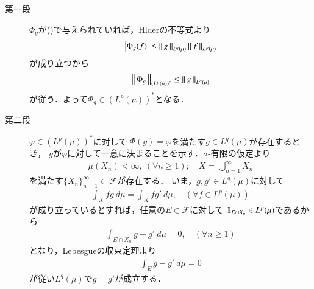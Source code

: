 	\begin{prf}\mbox{}
		\begin{description}
			\item[第一段]
				$\Phi_g$が()で与えられていれば，Hlderの不等式より
				\begin{align}
					\left|\Phi_g(f)\right| \leq \left\|\, g\, \right\|_{L^q(\mu)}\left\|\, f\, \right\|_{L^p(\mu)}
				\end{align}
				が成り立つから
				\begin{align}
					\left\|\, \Phi_g\, \right\|_{\left( L^p(\mu) \right)^*} \leq \left\|\, g\, \right\|_{L^q(\mu)}
					\label{eq:thm_dual_space_of_L_p_3}
				\end{align}
				が従う．よって$\Phi_g \in \left( L^p(\mu) \right)^*$となる．
			
			\item[第二段]
				$\varphi \in \left( L^p(\mu) \right)^*$に対して
				$\Phi(g) = \varphi$を満たす$g \in L^q(\mu)$が存在するとき，
				$g$が$\varphi$に対して一意に決まることを示す．$\sigma$-有限の仮定より
				\begin{align}
					\mu(X_n) < \infty,\ (\forall n \geq 1);
					\quad X = \bigcup_{n=1}^\infty X_n
					\label{eq:thm_dual_space_of_L_p_6}
				\end{align}
				を満たす$\{X_n\}_{n=1}^\infty \subset \mathscr{F}$が存在する．
				いま，$g,g' \in L^q(\mu)$に対して
				\begin{align}
					\int_X fg\ d\mu = \int_X fg'\ d\mu,
					\quad (\forall f \in L^p(\mu))
				\end{align}
				が成り立っているとすれば，任意の$E \in \mathscr{F}$に対して
				$\mbox{1}\hspace{-0.25em}\mbox{l}_{E \cap X_n} \in L^p(\mu)$であるから
				\begin{align}
					\int_{E \cap X_n} g-g'\ d\mu = 0,
					\quad (\forall n \geq 1)
				\end{align}
				となり，Lebesgueの収束定理より
				\begin{align}
					\int_E g-g'\ d\mu = 0
				\end{align}
				が従い$L^q(\mu)$で$g = g'$が成立する．
				

\end{description}
\end{prf}
